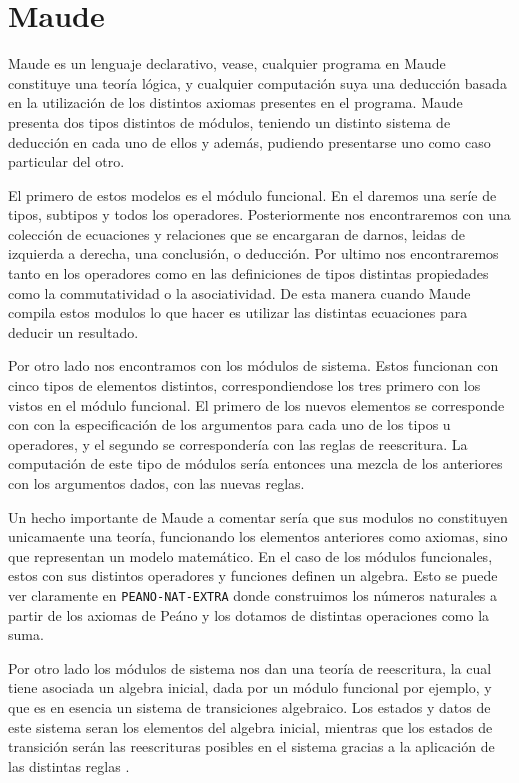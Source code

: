 
\section{Maude}

Maude es un lenguaje declarativo, vease, cualquier programa en Maude constituye una teoría lógica, y cualquier computación suya una deducción basada en la utilización de los distintos axiomas presentes en el programa. Maude presenta dos tipos distintos de módulos, teniendo un distinto sistema de deducción en cada uno de ellos y además, pudiendo presentarse uno como caso particular del otro.\par

El primero de estos modelos es el módulo funcional. En el daremos una seríe de tipos, subtipos y todos los operadores. Posteriormente nos encontraremos con una colección de ecuaciones y relaciones que se encargaran de darnos, leidas de izquierda a derecha, una conclusión, o deducción. Por ultimo nos encontraremos tanto en los operadores como en las definiciones de tipos distintas propiedades como la commutatividad o la asociatividad. De esta manera cuando Maude compila estos modulos lo que hacer es utilizar las distintas ecuaciones para deducir un resultado.\par

Por otro lado nos encontramos con los módulos de sistema. Estos funcionan con cinco tipos de elementos distintos, correspondiendose los tres primero con los vistos en el módulo funcional. El primero de los nuevos elementos se corresponde con con la especificación de los argumentos para cada uno de los tipos u operadores, y el segundo se correspondería con las reglas de reescritura. La computación de este tipo de módulos sería entonces una mezcla de los anteriores con los argumentos dados, con las nuevas reglas.\par

Un hecho importante de Maude a comentar sería que sus modulos no constituyen unicamaente una teoría, funcionando los elementos anteriores como axiomas, sino que representan un modelo matemático. En el caso de los módulos funcionales, estos con sus distintos operadores y funciones definen un algebra. Esto se puede ver claramente en \verb"PEANO-NAT-EXTRA" donde construimos los números naturales a partir de los axiomas de Peáno y los dotamos de distintas operaciones como la suma.\par

Por otro lado los módulos de sistema nos dan una teoría de reescritura, la cual tiene asociada un algebra inicial, dada por un módulo funcional por ejemplo, y que es en esencia un sistema de transiciones algebraico. Los estados y datos de este sistema seran los elementos del algebra inicial, mientras que los estados de transición serán las reescrituras posibles en el sistema gracias a la aplicación de las distintas reglas \cite{ref1}.\par


